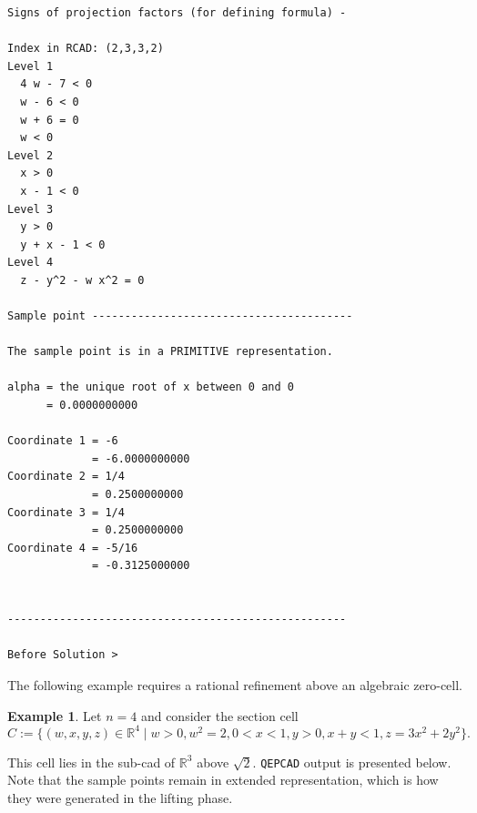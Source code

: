 \documentclass[
]{book}
\theoremstyle{definition}
\theoremstyle{definition}
\newtheorem{example}{Example}[chapter]
\theoremstyle{definition}
\theoremstyle{definition}
\theoremstyle{remark}
\begin{document}
\begin{verbatim}
Signs of projection factors (for defining formula) -

Index in RCAD: (2,3,3,2)
Level 1
  4 w - 7 < 0
  w - 6 < 0
  w + 6 = 0
  w < 0
Level 2
  x > 0
  x - 1 < 0
Level 3
  y > 0
  y + x - 1 < 0
Level 4
  z - y^2 - w x^2 = 0

Sample point ----------------------------------------

The sample point is in a PRIMITIVE representation.

alpha = the unique root of x between 0 and 0
      = 0.0000000000

Coordinate 1 = -6
             = -6.0000000000
Coordinate 2 = 1/4
             = 0.2500000000
Coordinate 3 = 1/4
             = 0.2500000000
Coordinate 4 = -5/16
             = -0.3125000000


----------------------------------------------------

Before Solution >
\end{verbatim}

The following example requires a rational refinement above an algebraic zero-cell.

\begin{example}
\protect\hypertarget{exm:qanm-4-above-alg}{}\label{exm:qanm-4-above-alg}Let \(n = 4\) and consider the section cell
\[
C := \{ (w,x,y,z) \in \mathbb{R}^4 \mid w > 0, w^2 = 2, 0 < x < 1, y > 0, x + y < 1, z = 3x^2 + 2y^2 \}.
\]
\end{example}

This cell lies in the sub-cad of \(\mathbb{R}^3\) above \(\sqrt{2}\). \texttt{QEPCAD} output is presented below. Note that the sample points remain in extended representation, which is how they were generated in the lifting phase.
\end{document}
